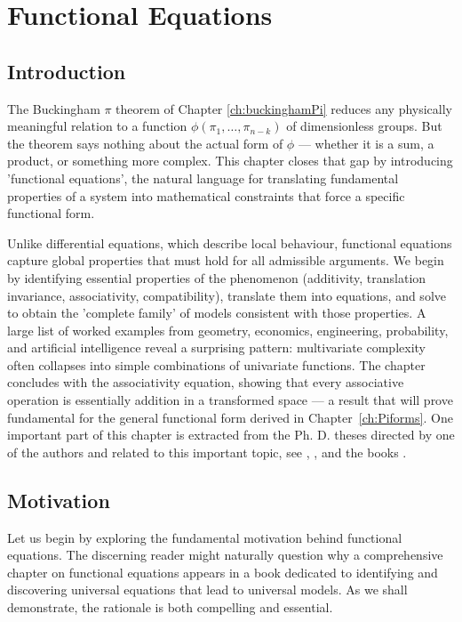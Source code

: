 \startcontents[chapter]
\chapter{Functional Equations}
\label{ch:functionalequations}
\minitocboxed

\section*{Introduction}
The Buckingham \(\pi\) theorem of Chapter \ref{ch:buckinghamPi} reduces any physically meaningful relation to a function \(\phi(\pi_1,\ldots,\pi_{n-k})\) of dimensionless groups. But the theorem says nothing about the actual form of \(\phi\) — whether it is a sum, a product, or something more complex. This chapter closes that gap by introducing 'functional equations', the natural language for translating fundamental properties of a system into mathematical constraints that force a specific functional form.

Unlike differential equations, which describe local behaviour, functional equations capture global properties that must hold for all admissible arguments. We begin by identifying essential properties of the phenomenon (additivity, translation invariance, associativity, compatibility), translate them into equations, and solve to obtain the 'complete family' of models consistent with those properties. A large list of worked examples from geometry, economics, engineering, probability, and artificial intelligence reveal a surprising pattern: multivariate complexity often collapses into simple combinations of univariate functions. The chapter concludes with the associativity equation, showing that every associative operation is essentially addition in a transformed space — a result that will prove fundamental for the general functional form derived in Chapter~\ref{ch:Piforms}. One important part of this chapter is extracted from the Ph. D. theses directed by one of the authors and related to this important topic, see \cite{RuizCobo1992}, \cite{CoboOrtega1993}, \cite{IglesiasPrieto1995} and the books \cite{castillo1992functional,castillo2004functional}.

\section{Motivation}
Let us begin by exploring the fundamental motivation behind functional equations. The discerning reader might naturally question why a comprehensive chapter on functional equations appears in a book dedicated to identifying and discovering universal equations that lead to universal models. As we shall demonstrate, the rationale is both compelling and essential.

